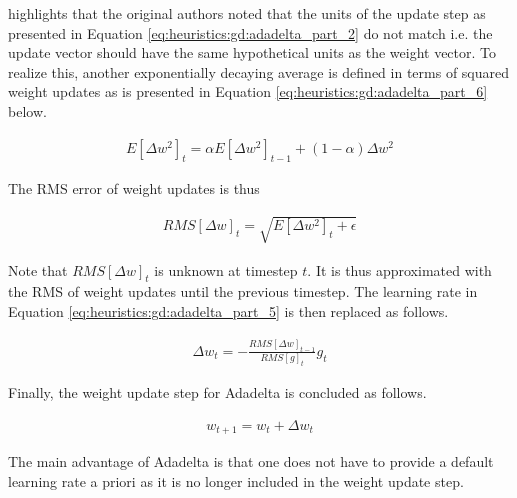 \citeauthor{ref:ruder:2016}\cite{ref:ruder:2016} highlights that the original authors \cite{ref:zeiler:2012} noted that the units of the update step as presented in Equation \ref{eq:heuristics:gd:adadelta_part_2} do not match i.e. the update vector should have the same hypothetical units as the weight vector. To realize this, another exponentially decaying average is defined in terms of squared weight updates as is presented in Equation \ref{eq:heuristics:gd:adadelta_part_6} below.

\begin{equation}
      \label{eq:heuristics:gd:adadelta_part_6}
      \begin{split}
            E[\Delta w^{2}]_{t} = \alpha E[\Delta w^{2}]_{t - 1} + (1 - \alpha)\Delta w^{2}
      \end{split}
\end{equation}

The \ac{RMS} error of weight updates is thus

\begin{equation}
      \label{eq:heuristics:gd:adadelta_part_7}
      \begin{split}
            RMS[\Delta w]_{t} = \sqrt{E[\Delta w^{2}]_{t} + \epsilon}
      \end{split}
\end{equation}

Note that $RMS[\Delta w]_{t}$ is unknown at timestep $t$. It is thus approximated with the \ac{RMS} of weight updates until the previous timestep. The learning rate in Equation \ref{eq:heuristics:gd:adadelta_part_5} is then replaced as follows.

\begin{equation}
      \label{eq:heuristics:gd:adadelta_part_8}
      \begin{split}
            \Delta w_{t} = - \frac{RMS[\Delta w]_{t-1}}{RMS[g]_{t}} g_{t}
      \end{split}
\end{equation}

Finally, the weight update step for \ac{Adadelta} is concluded as follows.

\begin{equation}
      \label{eq:heuristics:gd:adadelta_part_9}
      \begin{split}
            w_{t+1} = w_{t} + \Delta w_{t}
      \end{split}
\end{equation}

The main advantage of \ac{Adadelta} is that one does not have to provide a default learning rate a priori as it is no longer included in the weight update step.


